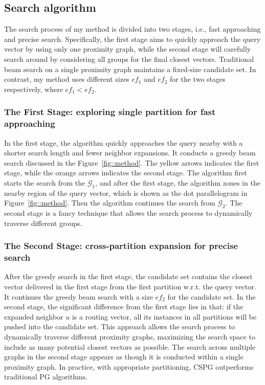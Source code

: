 \documentclass[UTF8]{article}
\begin{document}
\vspace{-3mm}
\subsection{Search algorithm}
The search process of my method is divided into two stages, i.e., fast approaching and precise search.
Specifically, the first stage aims to quickly approach the query vector by using only one proximity
graph, while the second stage will carefully search around by considering all groups for the
final closest vectors. Traditional beam search on a single proximity graph maintains a fixed-size
candidate set. In contrast, my method uses different sizes $ef_1$ and $ef_2$ for the two stages respectively,
where $ef_1 < ef_2$.

\subsubsection{The First Stage: exploring single partition for fast approaching}
In the first stage, the algorithm quickly approaches the query nearby with a shorter search length and
fewer neighbor expansions. It conducts a greedy beam search discussed in
the Figure~\ref{fig::method}. The yellow arrows indicates the first stage, while the orange arrows indicates the second stage.
The algorithm first starts the search from the $\mathcal{G}_1$, and after the first stage, the algorithm zones in the nearby region of 
the query vector, which is shown as the dot parallelogram in Figure~\ref{fig::method}. 
Then the algorithm continues the search from $\mathcal{G}_2$.
The second stage is a fancy technique that allows the search process to dynamically traverse different groups.

\subsubsection{The Second Stage: cross-partition expansion for precise search}
After the greedy search in the first stage, the candidate set contains the closest vector delivered in the
first stage from the first partition w.r.t. the query vector. It continues the greedy beam search with a size 
$ef_2$ for the candidate set. In the
second stage, the significant difference from the first stage lies in that: if the expanded
neighbor $u$ is a routing vector, all its instances in all partitions will be pushed into the candidate set. 
This approach allows the search process to dynamically traverse different proximity graphs, maximizing the search
space to include as many potential closest vectors as possible.
The search across multiple graphs in the second stage appears as though it is conducted
within a single proximity graph. In practice, with appropriate partitioning,
CSPG outperforms traditional PG algorithms.
\end{document}
